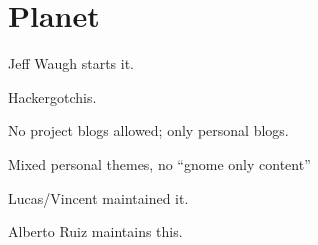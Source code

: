 \chapter{Planet \GNOME}

Jeff Waugh starts it.

Hackergotchis.

No project blogs allowed; only personal blogs.

Mixed personal themes, no ``gnome only content''

Lucas/Vincent maintained it.

Alberto Ruiz maintains this.
